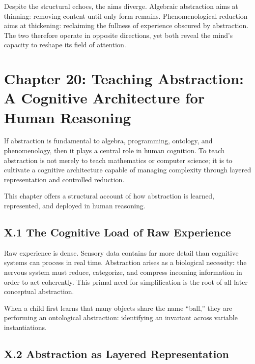 \documentclass[12pt,letterpaper]{article}
\theoremstyle{remark}
\begin{document}
Despite the structural echoes, the aims diverge. Algebraic abstraction aims at thinning: removing content until only form remains. Phenomenological reduction aims at thickening: reclaiming the fullness of experience obscured by abstraction. The two therefore operate in opposite directions, yet both reveal the mind’s capacity to reshape its field of attention.

\newpage

\section{Chapter 20: Teaching Abstraction: A Cognitive Architecture for Human Reasoning}

If abstraction is fundamental to algebra, programming, ontology, and phenomenology, then it plays a central role in human cognition. To teach abstraction is not merely to teach mathematics or computer science; it is to cultivate a cognitive architecture capable of managing complexity through layered representation and controlled reduction.

This chapter offers a structural account of how abstraction is learned, represented, and deployed in human reasoning.

\subsection{X.1 The Cognitive Load of Raw Experience}

Raw experience is dense. Sensory data contains far more detail than cognitive systems can process in real time. Abstraction arises as a biological necessity: the nervous system must reduce, categorize, and compress incoming information in order to act coherently. This primal need for simplification is the root of all later conceptual abstraction.

When a child first learns that many objects share the name ``ball,'' they are performing an ontological abstraction: identifying an invariant across variable instantiations.

\subsection{X.2 Abstraction as Layered Representation}
\end{document}
